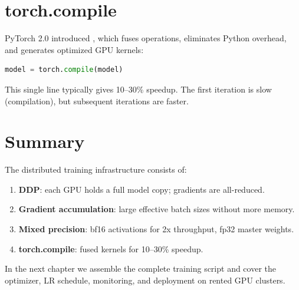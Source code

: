 \section{torch.compile}

PyTorch 2.0 introduced , which fuses operations, eliminates Python overhead, and generates optimized GPU kernels:

\begin{lstlisting}[language=Python]
model = torch.compile(model)
\end{lstlisting}

This single line typically gives 10--30\% speedup.  The first iteration is slow (compilation), but subsequent iterations are faster.


\section{Summary}

The distributed training infrastructure consists of:
\begin{enumerate}
  \item \textbf{DDP}: each GPU holds a full model copy; gradients are all-reduced.
  \item \textbf{Gradient accumulation}: large effective batch sizes without more memory.
  \item \textbf{Mixed precision}: bf16 activations for 2x throughput, fp32 master weights.
  \item \textbf{torch.compile}: fused kernels for 10--30\% speedup.
\end{enumerate}

In the next chapter we assemble the complete training script and cover the optimizer, LR schedule, monitoring, and deployment on rented GPU clusters.
